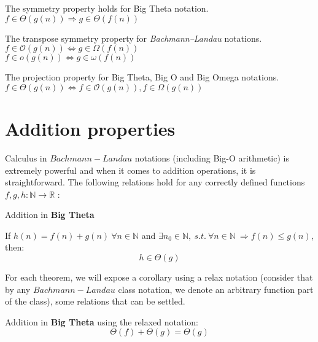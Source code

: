\begin{theorem} The symmetry property holds for Big Theta notation. \\  $ f \in \Theta(g(n)) \Rightarrow g \in \Theta(f(n)) $
\end{theorem} 

\begin{theorem} The transpose symmetry property for \textit{Bachmann–Landau} notations.  \\  $ f \in \mathcal{O}(g(n)) \Leftrightarrow g \in \Omega(f(n)) $
 \\  $ f \in o(g(n)) \Leftrightarrow g \in \omega(f(n)) $
\end{theorem} 
 
\begin{theorem} The projection property for Big Theta, Big O and Big Omega notations. \\  $ f \in \Theta(g(n)) \Leftrightarrow f \in \mathcal{O}(g(n)), f \in \Omega(g(n)) $
\end{theorem}
 
\section{Addition properties}
Calculus in $Bachmann-Landau$ notations (including Big-O arithmetic) is extremely powerful and when it comes to addition operations, it is straightforward. The following relations hold for any correctly defined functions $f, g, h:\mathbb{N}\longrightarrow\mathbb{R}$ :


 
  \begin{lemma} Addition in \textbf{Big Theta}

If  $ h(n) = f(n) + g(n)\  \forall n \in  \mathbb{N} $ and $\exists n_{0} \in \mathbb{N},\ s.t.\ \forall n \in \mathbb{N} \ \Rightarrow f(n) \leq g(n)$, then:
\[  h \in \Theta(g)\]

  \end{lemma}
  \begin{remark}
  For each theorem, we will expose a corollary using a relax notation (consider that by any $Bachmann-Landau$ class notation, we denote an arbitrary function part of the class), some relations that can be settled.
\end{remark}
  \begin{corollary} Addition in \textbf{Big Theta} using the relaxed notation: 
  \[  \Theta(f) + \Theta(g) = \Theta(g)\]
  \end{corollary}
  
